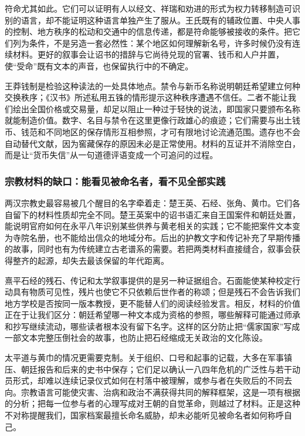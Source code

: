 符命尤其如此。它们可以证明有人以经文、祥瑞和劝进的形式为权力转移制造可识别的语言，却不能证明这种语言单独产生了服从。王氏既有的辅政位置、中央人事的控制、地方秩序的松动和交通中的信息传递，都是符命能够被接收的条件。把它们列为条件，不是另造一套必然性：某个地区如何理解新名号，许多时候仍没有连续材料。更好的叙事会让诏书的措辞与它尚待兑现的官署、钱币和人户并置，使“受命”既有文本的声音，也保留执行中的不确定。

王莽钱制是检验这种读法的一处具体地点。禁令与新币名称说明朝廷希望建立何种交换秩序；《汉书》所述私用五铢的情形提示这种秩序遭遇不信任。二者不能让我们绘出全国价格或交易量，却足以阻止一种过于轻快的说法，即国家只要颁布名称就能制造价值。数字、名目与禁令在这里更像行政雄心的痕迹；它们需要与出土钱币、钱范和不同地区的保存情形互相参照，才可有限地讨论流通范围。遗存也不会自动替代文献，因为窖藏保存的原因未必是正常使用。材料的互证并不消除空白，而是让“货币失信”从一句道德评语变成一个可追问的过程。

\subsubsection{宗教材料的缺口：能看见被命名者，看不见全部实践}

两汉宗教史最容易被几个醒目的名字牵着走：楚王英、石经、张角、黄巾。它们各自留下的材料性质却完全不同。楚王英案中的诏书语汇来自王国案件和朝廷处置，能说明官府如何在永平八年识别某些供养与黄老相关的实践；它不能把案件文本变为寺院名册，也不能给出信众的地域分布。后出的护教文字和传记补充了早期传播的故事，同时也有为传统建立古老谱系的需要。若把两类材料直接缝合，叙事会获得整齐的起源，却失去最该保留的年代距离。

熹平石经的残石、传记和太学叙事提供的是另一种证据组合。石面能使某种校定行动具有物质可见性，残片也使它不只依赖后世作者的称颂；但是残石不会告诉我们地方学校是否按同一版本教授，更不能替人们的阅读经验发言。相反，材料的价值正在于让我们区分：朝廷希望哪一种文本成为资格的参照，哪些解释可能通过师承和抄写继续流动，哪些读者根本没有留下名字。这样的区分防止把“儒家国家”写成一部文本完整压倒社会的故事，也防止把石经缩成无关政治的文化陈设。

太平道与黄巾的情况更需要克制。关于组织、口号和起事的记载，大多在军事镇压、朝廷报告和后来的史书中保存；它们足以确认一八四年危机的广泛性与若干动员形式，却难以连续记录仪式如何在村落中被理解，或参与者在失败后的不同去向。宗教语言可能使灾害、治病和政治不满获得共同的解释框架，这是一项有根据的分析；把每一位参与者的心理写成对王朝的自觉革命，则越过了材料。正是这种不对称提醒我们，国家档案最擅长命名威胁，却未必能听见被命名者如何称呼自己。

